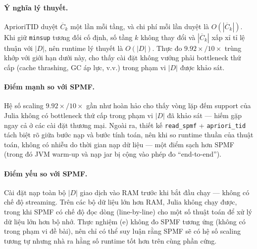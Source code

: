 \paragraph{Ý nghĩa lý thuyết.} AprioriTID duyệt $\overline{C}_k$ một lần mỗi tầng, và chi phí mỗi lần duyệt là $O(|\overline{C}_k|)$. Khi giữ \texttt{minsup} tương đối cố định, số tầng $k$ không thay đổi và $|\overline{C}_k|$ xấp xỉ tỉ lệ thuận với $|D|$, nên runtime lý thuyết là $O(|D|)$. Thực đo $9.92\times / 10\times$ trùng khớp với giới hạn dưới này, cho thấy cài đặt không vướng phải bottleneck thứ cấp (cache thrashing, GC áp lực, v.v.) trong phạm vi $|D|$ được khảo sát.

\paragraph{Điểm mạnh so với SPMF.} Hệ số scaling $9.92\times / 10\times$ gần như hoàn hảo cho thấy vòng lặp đếm support của Julia không có bottleneck thứ cấp trong phạm vi $|D|$ đã khảo sát --- hiếm gặp ngay cả ở các cài đặt thương mại. Ngoài ra, thiết kế \texttt{read\_spmf} + \texttt{apriori\_tid} tách biệt rõ giữa bước nạp và bước tính toán, nên khi so runtime thuần của thuật toán, không có nhiễu do thời gian nạp dữ liệu --- một điểm sạch hơn SPMF (trong đó JVM warm-up và nạp jar bị cộng vào phép đo ``end-to-end'').

\paragraph{Điểm yếu so với SPMF.} Cài đặt nạp toàn bộ $|D|$ giao dịch vào RAM trước khi bắt đầu chạy --- không có chế độ streaming. Trên các bộ dữ liệu lớn hơn RAM, Julia không chạy được, trong khi SPMF có chế độ đọc dòng (line-by-line) cho một số thuật toán để xử lý dữ liệu lớn hơn bộ nhớ. Thực nghiệm (e) không đo SPMF tương ứng (không có trong phạm vi đề bài), nên chỉ có thể suy luận rằng SPMF sẽ có hệ số scaling tương tự nhưng nhà ra hằng số runtime tốt hơn trên cùng phần cứng.

